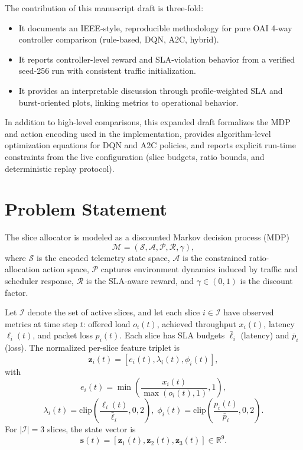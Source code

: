 \documentclass[journal]{IEEEtran}
\begin{document}
The contribution of this manuscript draft is three-fold:
\begin{itemize}
    \item It documents an IEEE-style, reproducible methodology for pure OAI 4-way controller comparison (rule-based, DQN, A2C, hybrid).
    \item It reports controller-level reward and SLA-violation behavior from a verified seed-256 run with consistent traffic initialization.
    \item It provides an interpretable discussion through profile-weighted SLA and burst-oriented plots, linking metrics to operational behavior.
\end{itemize}

In addition to high-level comparisons, this expanded draft formalizes the MDP and action encoding used in the implementation, provides algorithm-level optimization equations for DQN and A2C policies, and reports explicit run-time constraints from the live configuration (slice budgets, ratio bounds, and deterministic replay protocol).

\section{Problem Statement}
The slice allocator is modeled as a discounted Markov decision process (MDP)
\begin{equation}
\mathcal{M}=\left(\mathcal{S},\mathcal{A},\mathcal{P},\mathcal{R},\gamma\right),
\end{equation}
where $\mathcal{S}$ is the encoded telemetry state space, $\mathcal{A}$ is the constrained ratio-allocation action space, $\mathcal{P}$ captures environment dynamics induced by traffic and scheduler response, $\mathcal{R}$ is the SLA-aware reward, and $\gamma\in(0,1)$ is the discount factor.

Let $\mathcal{I}$ denote the set of active slices, and let each slice $i \in \mathcal{I}$ have observed metrics at time step $t$: offered load $o_i(t)$, achieved throughput $x_i(t)$, latency $\ell_i(t)$, and packet loss $p_i(t)$. Each slice has SLA budgets $\bar{\ell}_i$ (latency) and $\bar{p}_i$ (loss). The normalized per-slice feature triplet is
\begin{equation}
\mathbf{z}_i(t)=\left[e_i(t),\lambda_i(t),\phi_i(t)\right],
\end{equation}
with
\begin{equation}
e_i(t)=\min\left(\frac{x_i(t)}{\max(o_i(t),1)},1\right),
\end{equation}
\begin{equation}
\lambda_i(t)=\mathrm{clip}\left(\frac{\ell_i(t)}{\bar{\ell}_i},0,2\right),\;
\phi_i(t)=\mathrm{clip}\left(\frac{p_i(t)}{\bar{p}_i},0,2\right).
\end{equation}
For $|\mathcal{I}|=3$ slices, the state vector is
\begin{equation}
\mathbf{s}(t)=\left[\mathbf{z}_{1}(t),\mathbf{z}_{2}(t),\mathbf{z}_{3}(t)\right]\in\mathbb{R}^{9}.
\end{equation}
\end{document}
